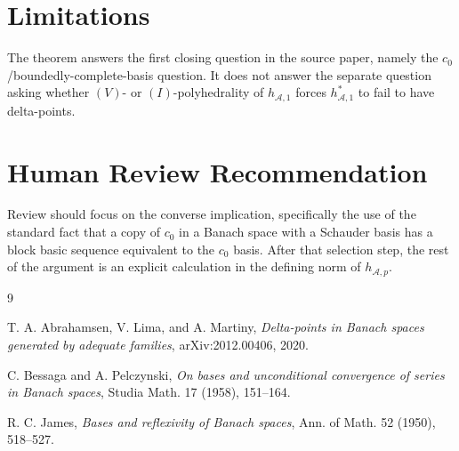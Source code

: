 \documentclass[11pt]{article}
\newcommand{\A}{\mathcal A}
\begin{document}
\section*{Limitations}

The theorem answers the first closing question in the source paper, namely the
\(c_0\)/boundedly-complete-basis question. It does not answer the separate
question asking whether \((V)\)- or \((I)\)-polyhedrality of \(h_{\A,1}\)
forces \(h_{\A,1}^{*}\) to fail to have delta-points.

\section*{Human Review Recommendation}

Review should focus on the converse implication, specifically the use of the
standard fact that a copy of \(c_0\) in a Banach space with a Schauder basis
has a block basic sequence equivalent to the \(c_0\) basis. After that
selection step, the rest of the argument is an explicit calculation in the
defining norm of \(h_{\A,p}\).

\begin{thebibliography}{9}

T. A. Abrahamsen, V. Lima, and A. Martiny,
\emph{Delta-points in Banach spaces generated by adequate families},
arXiv:2012.00406, 2020.

C. Bessaga and A. Pelczynski,
\emph{On bases and unconditional convergence of series in Banach spaces},
Studia Math. 17 (1958), 151--164.

R. C. James,
\emph{Bases and reflexivity of Banach spaces},
Ann. of Math. 52 (1950), 518--527.

\end{thebibliography}
\end{document}
